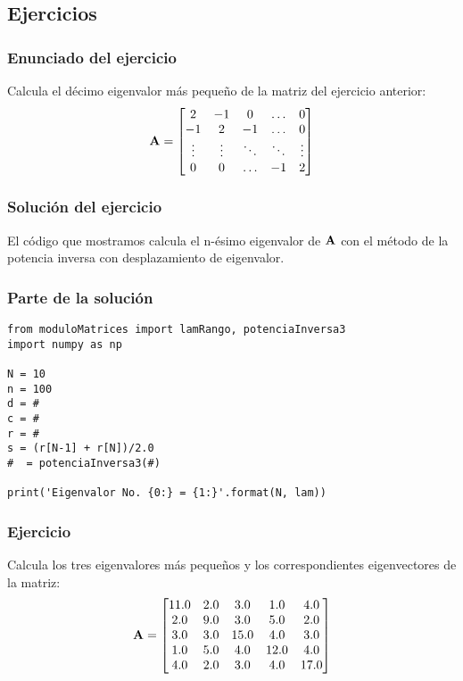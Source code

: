 \documentclass[12pt]{beamer}
\begin{document}
\subsection{Ejercicios}

\begin{frame}
\frametitle{Enunciado del ejercicio}
Calcula el décimo eigenvalor más pequeño de la matriz del ejercicio anterior:
\begin{align*}
\vb{A} =
\begin{bmatrix}
2 & -1 & 0 & \ldots & 0 \\
-1 & 2 & -1 & \ldots & 0 \\
\vdots & \vdots & \ddots & \ddots & \vdots \\
0 & 0 & \ldots & -1 & 2
\end{bmatrix}
\end{align*}
\end{frame}
\begin{frame}
\frametitle{Solución del ejercicio}
El código que mostramos calcula el n-ésimo eigenvalor de $\vb{A}$ con el método de la potencia inversa con desplazamiento de eigenvalor.
\end{frame}
\begin{frame}
\frametitle{Parte de la solución}
\begin{lstlisting}[caption=Parte del código que resuelve el ejercicio]
from moduloMatrices import lamRango, potenciaInversa3
import numpy as np

N = 10
n = 100
d = #
c = #
r = #
s = (r[N-1] + r[N])/2.0
#  = potenciaInversa3(#)

print('Eigenvalor No. {0:} = {1:}'.format(N, lam))
\end{lstlisting}
\end{frame}
\begin{frame}
\frametitle{Ejercicio}
Calcula los tres eigenvalores más pequeños y los correspondientes eigenvectores de la matriz:
\renewcommand{\arraystretch}{0.9}\begin{align*}
\vb{A} = 
\begin{bmatrix}
11.0 & 2.0 & 3.0 & 1.0 & 4.0 \\
2.0 & 9.0 & 3.0 & 5.0 & 2.0 \\
3.0 & 3.0 & 15.0 & 4.0 & 3.0 \\
1.0 & 5.0 & 4.0 & 12.0 & 4.0 \\
4.0 & 2.0 & 3.0 & 4.0 & 17.0
\end{bmatrix}
\end{align*}
\end{frame}
\end{document}
